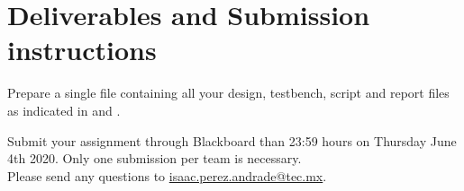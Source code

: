 \documentclass[number=03]{assignment}
\newcommand{\deadline}{23:59 hours on Thursday June 4th 2020}
\begin{document}
\section{Deliverables and Submission instructions}\label{sec:Deliverables}
Prepare a single  file containing all your design, testbench, script and report files as indicated in  and .

Submit your assignment through Blackboard  than \deadline.
Only one submission per team is necessary.
\\
Please send any questions to \href{mailto:isaac.perez.andrade@tec.mx}{isaac.perez.andrade@tec.mx}.
\end{document}
